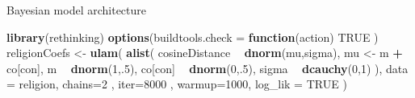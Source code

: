 \documentclass[10pt,ignorenonframetext,x11names, dvipsnames, bibspacing,natbib]{beamer}
\newenvironment{Shaded}{\begin{snugshade}}{\end{snugshade}}
\newcommand{\ControlFlowTok}[1]{\textcolor[rgb]{0.13,0.29,0.53}{\textbf{#1}}}
\newcommand{\DataTypeTok}[1]{\textcolor[rgb]{0.13,0.29,0.53}{#1}}
\newcommand{\DecValTok}[1]{\textcolor[rgb]{0.00,0.00,0.81}{#1}}
\newcommand{\KeywordTok}[1]{\textcolor[rgb]{0.13,0.29,0.53}{\textbf{#1}}}
\newcommand{\NormalTok}[1]{#1}
\newcommand{\OperatorTok}[1]{\textcolor[rgb]{0.81,0.36,0.00}{\textbf{#1}}}
\newcommand{\OtherTok}[1]{\textcolor[rgb]{0.56,0.35,0.01}{#1}}
\newcommand{\StringTok}[1]{\textcolor[rgb]{0.31,0.60,0.02}{#1}}
\begin{document}
\begin{frame}[fragile]{Bayesian model architecture}
\protect\hypertarget{bayesian-model-architecture}{}

\vspace{1mm}
\footnotesize

\begin{Shaded}
\begin{Highlighting}[]
\KeywordTok{library}\NormalTok{(rethinking)}
\KeywordTok{options}\NormalTok{(}\DataTypeTok{buildtools.check =} \ControlFlowTok{function}\NormalTok{(action) }\OtherTok{TRUE}\NormalTok{ )}
\NormalTok{religionCoefs <-}\StringTok{ }\KeywordTok{ulam}\NormalTok{(}
  \KeywordTok{alist}\NormalTok{(}
\NormalTok{    cosineDistance }\OperatorTok{~}\StringTok{ }\KeywordTok{dnorm}\NormalTok{(mu,sigma),}
\NormalTok{    mu <-}\StringTok{ }\NormalTok{m }\OperatorTok{+}\StringTok{ }\NormalTok{co[con],}
\NormalTok{    m }\OperatorTok{~}\StringTok{ }\KeywordTok{dnorm}\NormalTok{(}\DecValTok{1}\NormalTok{,.}\DecValTok{5}\NormalTok{),}
\NormalTok{    co[con] }\OperatorTok{~}\StringTok{ }\KeywordTok{dnorm}\NormalTok{(}\DecValTok{0}\NormalTok{,.}\DecValTok{5}\NormalTok{),}
\NormalTok{    sigma }\OperatorTok{~}\StringTok{ }\KeywordTok{dcauchy}\NormalTok{(}\DecValTok{0}\NormalTok{,}\DecValTok{1}\NormalTok{)}
\NormalTok{  ),}
  \DataTypeTok{data =}\NormalTok{ religion,}
  \DataTypeTok{chains=}\DecValTok{2}\NormalTok{ , }\DataTypeTok{iter=}\DecValTok{8000}\NormalTok{ , }\DataTypeTok{warmup=}\DecValTok{1000}\NormalTok{, }
  \DataTypeTok{log_lik =} \OtherTok{TRUE}
\NormalTok{)}
\end{Highlighting}
\end{Shaded}

\normalsize

\end{frame}
\end{document}
